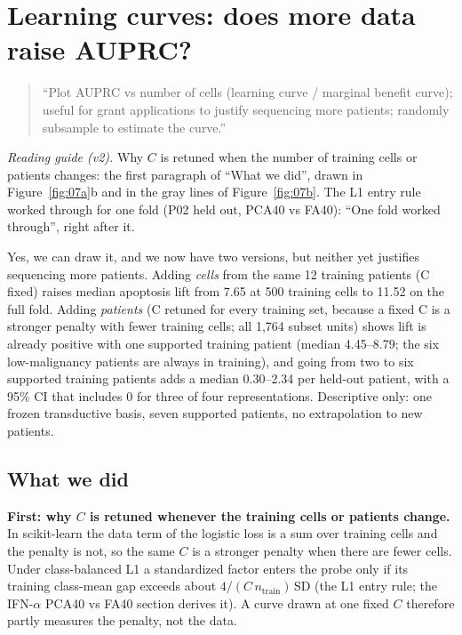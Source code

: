 \section{Learning curves: does more data raise AUPRC?}
\label{sec:learning-curves}

\begin{quote}
``Plot AUPRC vs number of cells (learning curve / marginal benefit curve); useful for grant applications to justify sequencing more patients; randomly subsample to estimate the curve.''
\end{quote}

{\small\color{inkmuted}\emph{Reading guide (v2).} Why $C$ is retuned when the number of training cells or patients changes: the first paragraph of ``What we did'', drawn in Figure~\ref{fig:07a}b and in the gray lines of Figure~\ref{fig:07b}. The L1 entry rule worked through for one fold (P02 held out, PCA40 vs FA40): ``One fold worked through'', right after it.\par}

\begin{answerbox}
Yes, we can draw it, and we now have two versions, but neither yet justifies sequencing more patients. Adding \emph{cells} from the same 12 training patients (C fixed) raises median apoptosis lift from 7.65\pp{} at 500 training cells to 11.52\pp{} on the full fold. Adding \emph{patients} (C retuned for every training set, because a fixed C is a stronger penalty with fewer training cells; all 1,764 subset units) shows lift is already positive with one supported training patient (median 4.45--8.79\pp{}; the six low-malignancy patients are always in training), and going from two to six supported training patients adds a median 0.30--2.34\pp{} per held-out patient, with a 95\% CI that includes 0 for three of four representations. Descriptive only: one frozen transductive basis, seven supported patients, no extrapolation to new patients.
\end{answerbox}

\subsection*{What we did}

\textbf{First: why $C$ is retuned whenever the training cells or patients change.} In scikit-learn the data term of the logistic loss is a sum over training cells and the penalty is not, so the same $C$ is a stronger penalty when there are fewer cells. Under class-balanced L1 a standardized factor enters the probe only if its training class-mean gap exceeds about $4/(C\,n_{\text{train}})$\,SD (the L1 entry rule; the IFN-$\alpha$ PCA40 vs FA40 section derives it). A curve drawn at one fixed $C$ therefore partly measures the penalty, not the data.

